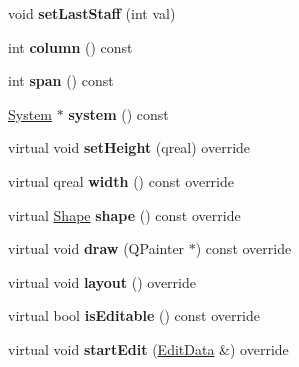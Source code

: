 \begin{DoxyCompactItemize}
void {\bfseries set\+Last\+Staff} (int val)
\item 
\mbox{\label{class_ms_1_1_bracket_aa9324abdb9a6a0b65cfbd29441dd88a7}} 
int {\bfseries column} () const
\item 
\mbox{\label{class_ms_1_1_bracket_ac4b796962a940da8d147362bdd9e7bda}} 
int {\bfseries span} () const
\item 
\mbox{\label{class_ms_1_1_bracket_aab62e67b8d6381d2ec6c3784eb3b88d7}} 
\hyperlink{class_ms_1_1_system}{System} $\ast$ {\bfseries system} () const
\item 
\mbox{\label{class_ms_1_1_bracket_a0acfd3a5e92214b34b3d36536ef04efe}} 
virtual void {\bfseries set\+Height} (qreal) override
\item 
\mbox{\label{class_ms_1_1_bracket_a1cbefa83b8b6f4f6da3b6a6f8469cf4e}} 
virtual qreal {\bfseries width} () const override
\item 
\mbox{\label{class_ms_1_1_bracket_aac0559bf197a008701c83dfd212fcf8d}} 
virtual \hyperlink{class_ms_1_1_shape}{Shape} {\bfseries shape} () const override
\item 
\mbox{\label{class_ms_1_1_bracket_a79c0258a037314616dd4474c7426191b}} 
virtual void {\bfseries draw} (Q\+Painter $\ast$) const override
\item 
\mbox{\label{class_ms_1_1_bracket_a35469b82360f635fc08d411dd0211759}} 
virtual void {\bfseries layout} () override
\item 
\mbox{\label{class_ms_1_1_bracket_a68d129dedde0fe55374581555eafe58e}} 
virtual bool {\bfseries is\+Editable} () const override
\item 
\mbox{\label{class_ms_1_1_bracket_ac1eceed8c06569e0144da34fddc6b8bc}} 
virtual void {\bfseries start\+Edit} (\hyperlink{class_ms_1_1_edit_data}{Edit\+Data} \&) override
\item 
\mbox{\label{class_ms_1_1_bracket_a59bc5f6c1e93f84e1be70b484c7beda1}} 

\end{DoxyCompactItemize}

